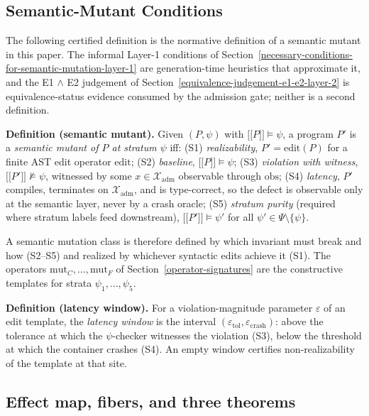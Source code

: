 \documentclass[manuscript,screen,review]{acmart}
\begin{document}
\subsection{Semantic-Mutant Conditions}\label{theory-s1s5}

The following certified definition is the normative definition of a
semantic mutant in this paper. The informal Layer-1 conditions of
Section~\ref{necessary-conditions-for-semantic-mutation-layer-1} are
generation-time heuristics that approximate it, and the E1 $\wedge$ E2
judgement of Section~\ref{equivalence-judgement-e1-e2-layer-2} is
equivalence-status evidence consumed by the admission gate; neither is a
second definition.

\textbf{Definition (semantic mutant).} Given $(P, \psi)$ with
$\mathopen{\lbrack\!\lbrack} P \mathclose{\rbrack\!\rbrack} \models \psi$, a program $P'$ is a
\emph{semantic mutant of $P$ at stratum $\psi$} iff: (S1)
\emph{realizability}, $P' = \mathrm{edit}(P)$ for a finite AST edit
operator $\mathrm{edit}$; (S2)
\emph{baseline}, $\mathopen{\lbrack\!\lbrack} P \mathclose{\rbrack\!\rbrack} \models \psi$; (S3)
\emph{violation with witness},
$\mathopen{\lbrack\!\lbrack} P' \mathclose{\rbrack\!\rbrack} \not\models \psi$, witnessed by some
$x \in \mathcal{X}_{\mathrm{adm}}$ observable through $\mathrm{obs}$; (S4)
\emph{latency}, $P'$ compiles, terminates on $\mathcal{X}_{\mathrm{adm}}$,
and is type-correct, so the defect is observable only at the semantic
layer, never by a crash oracle; (S5) \emph{stratum purity} (required
where stratum labels feed downstream),
$\mathopen{\lbrack\!\lbrack} P' \mathclose{\rbrack\!\rbrack} \models \psi'$ for all
$\psi' \in \Psi \setminus \{\psi\}$.

A semantic mutation class is therefore defined by which invariant must
break and how (S2--S5) and realized by whichever syntactic edits achieve
it (S1). The operators $\mathrm{mut}_C, \dots, \mathrm{mut}_F$ of Section~\ref{operator-signatures}
are the constructive templates for strata $\psi_1, \dots, \psi_5$.

\textbf{Definition (latency window).} For a violation-magnitude
parameter $\varepsilon$ of an edit template, the \emph{latency window}
is the interval $(\varepsilon_{\mathrm{tol}}, \varepsilon_{\mathrm{crash}})$:
above the tolerance at which the $\psi$-checker witnesses the violation
(S3), below the threshold at which the container crashes (S4). An empty
window certifies non-realizability of the template at that site.

\subsection{Effect map, fibers, and three theorems}\label{theory-fibers}
\end{document}
